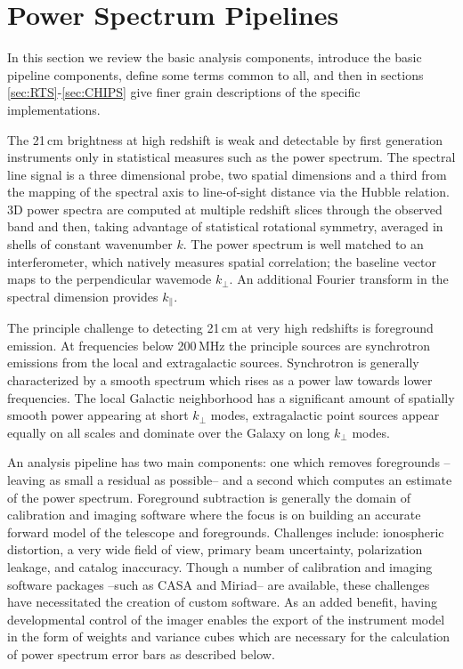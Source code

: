 \documentclass[preprint2]{aastex}
\begin{document}
\section{Power Spectrum Pipelines}
\label{sec:pipelines}
In this section we review the basic analysis components, introduce the basic pipeline components, define some terms common to all, and then in sections \ref{sec:RTS}-\ref{sec:CHIPS} give finer grain descriptions of the specific implementations.

The 21\,cm brightness at high redshift is weak and detectable by first generation instruments only in	 statistical measures such as the power spectrum. The spectral line signal is a three dimensional probe, two spatial dimensions and a third from the mapping of the spectral axis to line-of-sight distance via the Hubble relation. 3D power spectra are computed at multiple redshift slices through the observed band and then, taking advantage of statistical rotational symmetry, averaged in shells of constant wavenumber $k$.  The power spectrum is well matched to an interferometer, which natively measures spatial correlation; the baseline vector maps to the perpendicular wavemode $k_\perp$.  An additional Fourier transform in the spectral dimension provides $k_\parallel$.  

The principle challenge to detecting 21\,cm at very high redshifts is foreground emission. At frequencies below 200\,MHz the principle sources are synchrotron emissions from the local and extragalactic sources. Synchrotron is generally characterized by a smooth spectrum which rises as a power law towards lower frequencies. The local Galactic neighborhood has a significant amount of spatially smooth power appearing at short $k_\perp$ modes, extragalactic point sources appear equally on all scales and dominate over the Galaxy on long $k_\perp$ modes.

An analysis pipeline has two main components: one which removes foregrounds --leaving as small a residual as possible-- and a second which computes an estimate of the power spectrum.   Foreground subtraction is generally the domain of calibration and imaging software where the focus is on building an accurate forward model of the telescope and foregrounds.  Challenges include: ionospheric distortion, a very wide field of view, primary beam uncertainty, polarization leakage, and catalog inaccuracy. Though a number of calibration and imaging software packages --such as CASA and Miriad-- are available, these challenges have necessitated the creation of custom software.  As an added benefit, having developmental control of the imager enables the export of the instrument model in the form of weights and variance cubes which are necessary for the calculation of power spectrum error bars as described below. 
\end{document}
